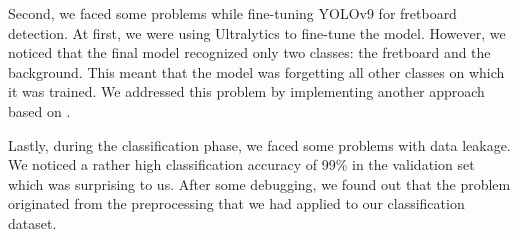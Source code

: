 \documentclass[10pt,twocolumn,letterpaper]{article}
\begin{document}
Second, we faced some problems while fine-tuning YOLOv9 for fretboard detection. At first, we were using Ultralytics to fine-tune the model. However, we noticed that the final model recognized only two classes: the fretboard and the background. This meant that the model was forgetting all other classes on which it was trained. We addressed this problem by implementing another approach based on \cite{Extendin94:online}.

Lastly, during the classification phase, we faced some problems with data leakage. We noticed a rather high classification accuracy of 99\% in the validation set which was surprising to us. After some debugging, we found out that the problem originated from the preprocessing that we had applied to our classification dataset.


    {\small
        
        
    }
\end{document}
